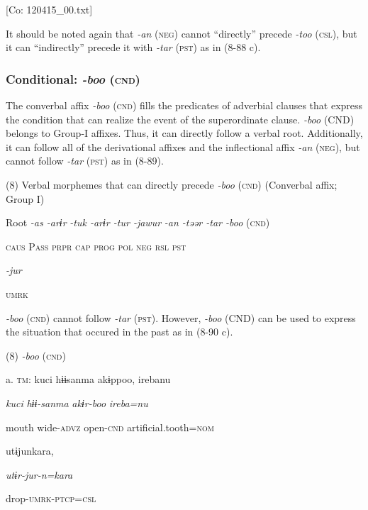       [Co: 120415\_00.txt]

It should be noted again that \textit{-an} (\textsc{neg}) cannot “directly” precede \textit{{}-too} (\textsc{csl}), but it can “indirectly” precede it with \textit{{}-tar} (\textsc{pst}) as in (8-88 c).

\subsubsection{Conditional: \textit{{}-boo} (\textsc{cnd})}

The converbal affix \textit{{}-boo} (\textsc{cnd}) fills the predicates of adverbial clauses that express the condition that can realize the event of the superordinate clause. \textit{{}-boo} (CND) belongs to Group-I affixes. Thus, it can directly follow a verbal root. Additionally, it can follow all of the derivational affixes and the inflectional affix \textit{{}-an} (\textsc{neg}), but cannot follow \textit{{}-tar} (\textsc{pst}) as in (8-89).

(8)  Verbal morphemes that can directly precede \textit{{}-boo} (\textsc{cnd}) (Converbal affix; Group I)

  Root  \textit{{}-as  {}-arɨr} %
\textit{{}-tuk  {}-arɨr  {}-tur  {}-jawur} %
\textit{{}-an  {}-təər  {}-tar  {}-boo} (\textsc{cnd})

    \textsc{caus}  P\textsc{ass}  \textsc{prpr}  \textsc{cap}  \textsc{prog}  \textsc{pol}  \textsc{neg}  \textsc{rsl}  \textsc{pst}

          \textit{{}-jur} 

          \textsc{umrk}

\textit{{}-boo} (\textsc{cnd}) cannot follow \textit{{}-tar} (\textsc{pst}). However, \textit{-boo} (CND) can be used to express the situation that occured in the past as in (8-90 c).

(8)  \textit{{}-boo} (\textsc{cnd})

  a.  \textsc{tm}:  kuci  hɨɨsanma  akɨppoo,  {\textbar}ireba{\textbar}nu

      \textit{kuci}  \textit{hɨɨ-sanma}  \textit{akɨr-boo}  \textit{ireba=nu}

      mouth  wide-\textsc{advz}  open-\textsc{cnd}  artificial.tooth=\textsc{nom}

      utɨjunkara,

      \textit{utɨr-jur-n=kara}

      drop-\textsc{umrk}-\textsc{ptcp}=\textsc{csl}

